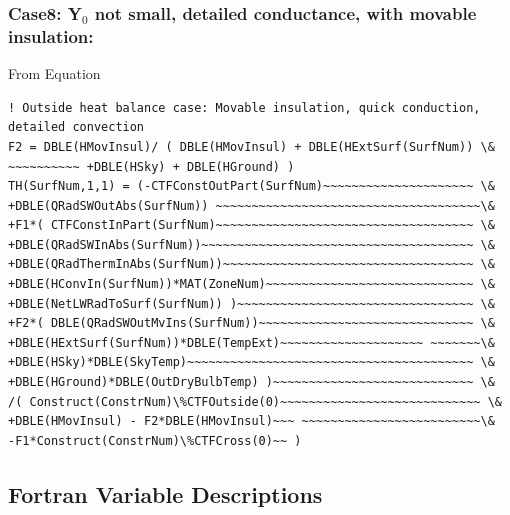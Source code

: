 \subsubsection{\texorpdfstring{Case8: Y\(_{0}\) not small, detailed conductance, with movable insulation:}{Case8: Y\_\{0\} not small, detailed conductance, with movable insulation:}}\label{case8-yux5f0-not-small-detailed-conductance-with-movable-insulation-1}

From Equation

\begin{lstlisting}
! Outside heat balance case: Movable insulation, quick conduction, detailed convection
F2 = DBLE(HMovInsul)/ ( DBLE(HMovInsul) + DBLE(HExtSurf(SurfNum)) \&
~~~~~~~~~~ +DBLE(HSky) + DBLE(HGround) )
TH(SurfNum,1,1) = (-CTFConstOutPart(SurfNum)~~~~~~~~~~~~~~~~~~~~~ \&
+DBLE(QRadSWOutAbs(SurfNum)) ~~~~~~~~~~~~~~~~~~~~~~~~~~~~~~~~~~~~~\&
+F1*( CTFConstInPart(SurfNum)~~~~~~~~~~~~~~~~~~~~~~~~~~~~~~~~~~~~ \&
+DBLE(QRadSWInAbs(SurfNum))~~~~~~~~~~~~~~~~~~~~~~~~~~~~~~~~~~~~~~ \&
+DBLE(QRadThermInAbs(SurfNum))~~~~~~~~~~~~~~~~~~~~~~~~~~~~~~~~~~~ \&
+DBLE(HConvIn(SurfNum))*MAT(ZoneNum)~~~~~~~~~~~~~~~~~~~~~~~~~~~~~ \&
+DBLE(NetLWRadToSurf(SurfNum)) )~~~~~~~~~~~~~~~~~~~~~~~~~~~~~~~~~ \&
+F2*( DBLE(QRadSWOutMvIns(SurfNum))~~~~~~~~~~~~~~~~~~~~~~~~~~~~~~ \&
+DBLE(HExtSurf(SurfNum))*DBLE(TempExt)~~~~~~~~~~~~~~~~~~~~ ~~~~~~~\&
+DBLE(HSky)*DBLE(SkyTemp)~~~~~~~~~~~~~~~~~~~~~~~~~~~~~~~~~~~~~~~~ \&
+DBLE(HGround)*DBLE(OutDryBulbTemp) )~~~~~~~~~~~~~~~~~~~~~~~~~~~~ \&
/( Construct(ConstrNum)\%CTFOutside(0)~~~~~~~~~~~~~~~~~~~~~~~~~~~~ \&
+DBLE(HMovInsul) - F2*DBLE(HMovInsul)~~~ ~~~~~~~~~~~~~~~~~~~~~~~~~\&
-F1*Construct(ConstrNum)\%CTFCross(0)~~ )
\end{lstlisting}

\subsection{Fortran Variable Descriptions}\label{fortran-variable-descriptions}


